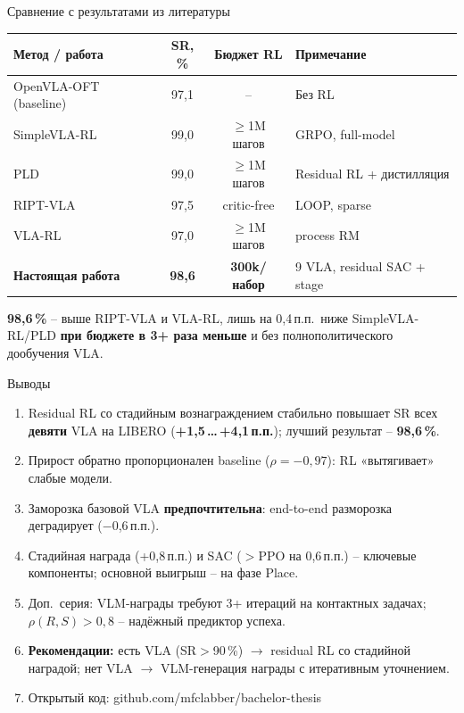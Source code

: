 \documentclass[aspectratio=169,13pt]{beamer}
\begin{document}
\begin{frame}{Сравнение с результатами из литературы}
  \centering
  \footnotesize
  \setlength{\tabcolsep}{4pt}
  \renewcommand{\arraystretch}{1.2}
  \begin{tabular}{lccp{}}
    \toprule
    \textbf{Метод / работа} & \textbf{SR, \%} & \textbf{Бюджет RL} & \textbf{Примечание} \\
    \midrule
    OpenVLA-OFT (baseline) & 97,1 & -- & Без RL \\
    SimpleVLA-RL & 99,0 & $\geq$1M шагов & GRPO, full-model \\
    PLD & 99,0 & $\geq$1M шагов & Residual RL + дистилляция \\
    RIPT-VLA & 97,5 & critic-free & LOOP, sparse \\
    VLA-RL & 97,0 & $\geq$1M шагов & process RM \\
    \textbf{Настоящая работа} & \textbf{98,6} & \textbf{300k/набор} & 9 VLA, residual SAC + stage \\
    \bottomrule
  \end{tabular}

  \vspace{6pt}
  {\small \textbf{98,6\,\%} -- выше RIPT-VLA и VLA-RL, лишь на 0,4\,п.п.\ ниже SimpleVLA-RL/PLD \textbf{при бюджете в 3+ раза меньше} и без полнополитического дообучения VLA.}
\end{frame}

\begin{frame}{Выводы}
  \begin{enumerate}\setlength\itemsep{3pt}\small
    \item Residual RL со стадийным вознаграждением стабильно повышает SR всех \textbf{девяти} VLA на LIBERO (\textbf{+1,5\,\ldots\,+4,1\,п.п.}); лучший результат -- \textbf{98,6\,\%}.
    \item Прирост обратно пропорционален baseline (\textbf{\textcolor{itmopurple}{$\rho=-0{,}97$}}): RL «вытягивает» слабые модели.
    \item Заморозка базовой VLA \textbf{предпочтительна}: end-to-end разморозка деградирует ($-$0,6\,п.п.).
    \item Стадийная награда (+0,8\,п.п.) и SAC ($>$PPO на 0,6\,п.п.) -- ключевые компоненты; основной выигрыш -- на фазе Place.
    \item Доп.\ серия: VLM-награды требуют 3+ итераций на контактных задачах; $\rho(R,S)>0{,}8$ -- надёжный предиктор успеха.
    \item \textbf{Рекомендации:} есть VLA (SR$>$90\,\%) $\to$ residual RL со стадийной наградой; нет VLA $\to$ VLM-генерация награды с итеративным уточнением.
    \item Открытый код: \textcolor{itmopurple}{github.com/mfclabber/bachelor-thesis}
  \end{enumerate}
\end{frame}
\end{document}
